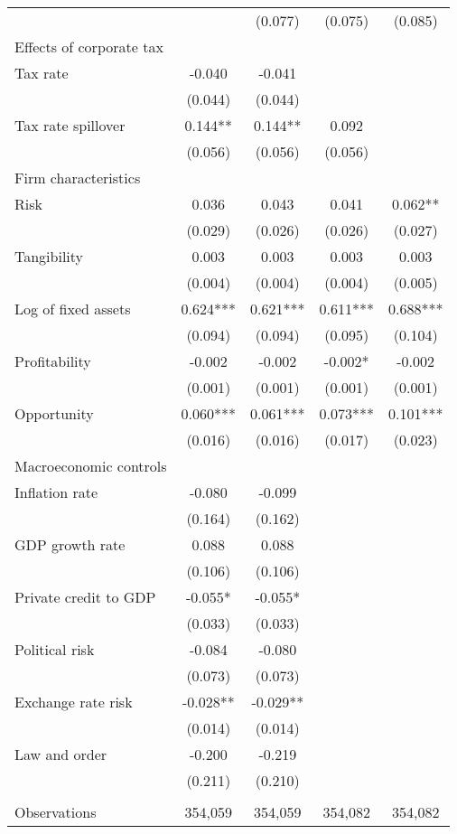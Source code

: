 \begin{longtable}{lcccc}
 &  & (0.077) & (0.075) & (0.085) \\
   Effects of corporate tax &  &  &  \\
\quad Tax rate & -0.040 & -0.041 &  &  \\
 & (0.044) & (0.044) &  &  \\
\quad Tax rate spillover & 0.144** & 0.144** & 0.092 &  \\
 & (0.056) & (0.056) & (0.056) &  \\
    Firm characteristics &  &  &  \\
\quad Risk & 0.036 & 0.043 & 0.041 & 0.062** \\
 & (0.029) & (0.026) & (0.026) & (0.027) \\
\quad Tangibility & 0.003 & 0.003 & 0.003 & 0.003 \\
 & (0.004) & (0.004) & (0.004) & (0.005) \\
\quad Log of fixed assets & 0.624*** & 0.621*** & 0.611*** & 0.688*** \\
 & (0.094) & (0.094) & (0.095) & (0.104) \\
\quad Profitability & -0.002 & -0.002 & -0.002* & -0.002 \\
 & (0.001) & (0.001) & (0.001) & (0.001) \\
\quad Opportunity & 0.060*** & 0.061*** & 0.073*** & 0.101*** \\
 & (0.016) & (0.016) & (0.017) & (0.023) \\
     Macroeconomic controls &  &  &  \\
\quad Inflation rate & -0.080 & -0.099 &  &  \\
 & (0.164) & (0.162) &  &  \\
\quad GDP growth rate & 0.088 & 0.088 &  &  \\
 & (0.106) & (0.106) &  &  \\
\quad Private credit to GDP & -0.055* & -0.055* &  &  \\
 & (0.033) & (0.033) &  &  \\
\quad Political risk & -0.084 & -0.080 &  &  \\
 & (0.073) & (0.073) &  &  \\
\quad Exchange rate risk & -0.028** & -0.029** &  &  \\
 & (0.014) & (0.014) &  &  \\
\quad Law and order & -0.200 & -0.219 &  &  \\
 & (0.211) & (0.210) &  &  \\
 &  &  &  &  \\
Observations & 354,059 & 354,059 & 354,082 & 354,082 \\

\end{longtable}
